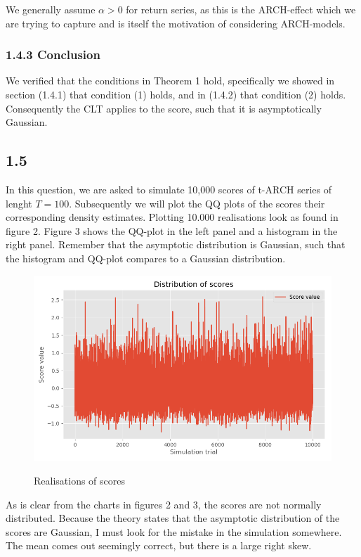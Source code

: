 \documentclass[11pt,a4paper,oneside]{article}
\begin{document}
We generally assume $\alpha> 0$ for return series, as this is the ARCH-effect which we are trying to capture and is itself the motivation of considering ARCH-models.

\subsubsection{1.4.3 Conclusion}
We verified that the conditions in Theorem 1 hold, specifically we showed in section (1.4.1) that condition (1) holds, and in (1.4.2) that condition (2) holds. Consequently the CLT applies to the score, such that it is asymptotically Gaussian.


\subsection{1.5}
In this question, we are asked to simulate 10,000 scores of t-ARCH series of lenght $T = 100$. Subsequently we will plot the QQ plots of the scores their corresponding density estimates. Plotting 10.000 realisations look as found in figure 2. Figure 3 shows the QQ-plot in the left panel and a histogram in the right panel. Remember that the asymptotic distribution is Gaussian, such that the histogram and QQ-plot compares to a Gaussian distribution.

\begin{figure}[ht]
\center
\caption{Realisations of scores}
\includegraphics[scale=0.5]{images/score_simulation.png}
\begingroup
{}
\endgroup
\end{figure}

As is clear from the charts in figures 2 and 3, the scores are not normally distributed. Because the theory states that the asymptotic distribution of the scores are Gaussian, I must look for the mistake in the simulation somewhere. The mean comes out seemingly correct, but there is a large right skew.
\end{document}
